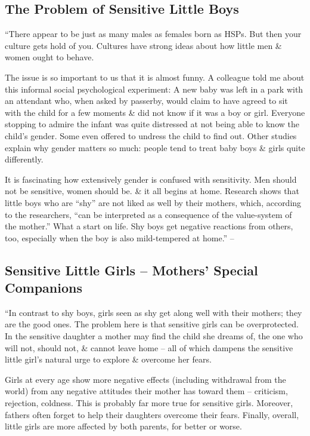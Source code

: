 \documentclass{article}
\numberwithin{equation}{section}
\begin{document}
\subsection{The Problem of Sensitive Little Boys}
``There appear to be just as many males as females born as HSPs. But then your culture gets hold of you. Cultures have strong ideas about how little men \& women ought to behave.

The issue is so important to us that it is almost funny. A colleague told me about this informal social psychological experiment: A new baby was left in a park with an attendant who, when asked by passerby, would claim to have agreed to sit with the child for a few moments \& did not know if it was a boy or girl. Everyone stopping to admire the infant was quite distressed at not being able to know the child's gender. Some even offered to undress the child to find out. Other studies explain why gender matters so much: people tend to treat baby boys \& girls quite differently.

It is fascinating how extensively gender is confused with sensitivity. Men should not be sensitive, women should be. \& it all begins at home. Research shows that little boys who are ``shy'' are not liked as well by their mothers, which, according to the researchers, ``can be interpreted as a consequence of the value-system of the mother.'' What a start on life. Shy boys get negative reactions from others, too, especially when the boy is also mild-tempered at home.'' -- \cite[p. 108]{Aron2013}

\subsection{Sensitive Little Girls -- Mothers' Special Companions}
``In contrast to shy boys, girls seen as shy get along well with their mothers; they are the good ones. The problem here is that sensitive girls can be overprotected. In the sensitive daughter a mother may find the child she dreams of, the one who will not, should not, \& cannot leave home -- all of which dampens the sensitive little girl's natural urge to explore \& overcome her fears.

Girls at every age show more negative effects (including withdrawal from the world) from any negative attitudes their mother has toward them -- criticism, rejection, coldness. This is probably far more true for sensitive girls. Moreover, fathers often forget to help their daughters overcome their fears. Finally, overall, little girls are more affected by both parents, for better or worse.
\end{document}
